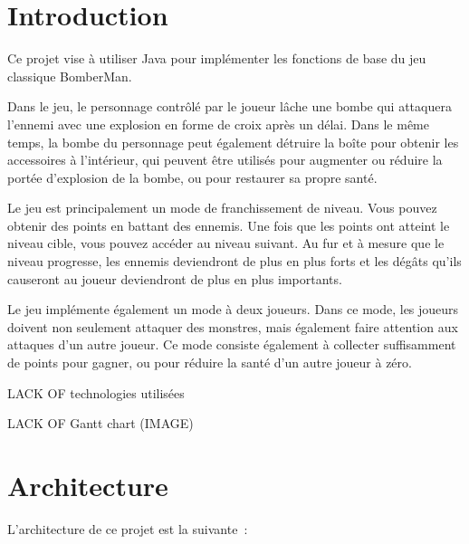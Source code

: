 \documentclass[11pt,english]{article}
\begin{document}
\pagebreak

\tableofcontents

\pagebreak

\large 

\section{Introduction}

\indent

Ce projet vise à utiliser Java pour implémenter les fonctions de base du jeu classique BomberMan.

\indent Dans le jeu, le personnage contrôlé par le joueur lâche une bombe qui attaquera l'ennemi avec une explosion en forme de croix après un délai. Dans le même temps, la bombe du personnage peut également détruire la boîte pour obtenir les accessoires à l'intérieur, qui peuvent être utilisés pour augmenter ou réduire la portée d'explosion de la bombe, ou pour restaurer sa propre santé.

\indent Le jeu est principalement un mode de franchissement de niveau. Vous pouvez obtenir des points en battant des ennemis. Une fois que les points ont atteint le niveau cible, vous pouvez accéder au niveau suivant. Au fur et à mesure que le niveau progresse, les ennemis deviendront de plus en plus forts et les dégâts qu'ils causeront au joueur deviendront de plus en plus importants.

\indent Le jeu implémente également un mode à deux joueurs. Dans ce mode, les joueurs doivent non seulement attaquer des monstres, mais également faire attention aux attaques d'un autre joueur. Ce mode consiste également à collecter suffisamment de points pour gagner, ou pour réduire la santé d'un autre joueur à zéro.

\indent LACK OF technologies utilisées

\indent LACK OF Gantt chart (IMAGE)


\section{Architecture}

\indent

L'architecture de ce projet est la suivante :
\end{document}
